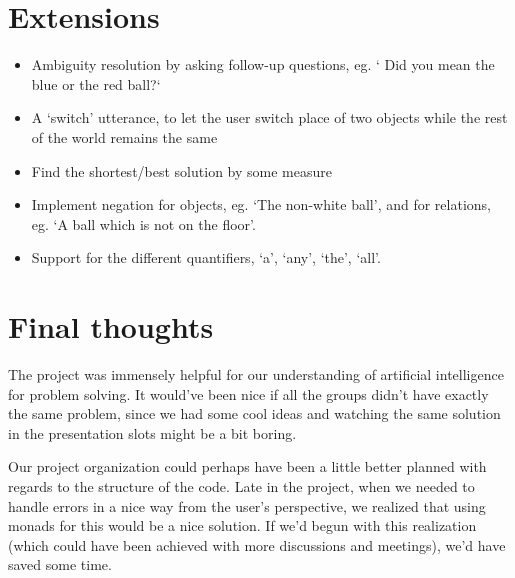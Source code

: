 \documentclass[11pt]{article}
\begin{document}








\section*{Extensions}
\begin{itemize}
\item Ambiguity resolution by asking follow-up questions, eg. ` Did you mean the blue or the red ball?`
\item A `switch' utterance, to let the user switch place of two objects while the rest of the world remains the same
\item Find the shortest/best solution by some measure
\item Implement negation for objects, eg. `The non-white ball', and for relations, eg. `A ball which is not on the floor'.
\item Support for the different quantifiers, `a', `any', `the', `all'.
\end{itemize}

\section*{Final thoughts}
The project was immensely helpful for our understanding of artificial intelligence for problem solving. It would've been nice if all the groups didn't have exactly the same problem, since we had some cool ideas and watching the same solution in the presentation slots might be a bit boring.

Our project organization could perhaps have been a little better planned with regards to the structure of the code.
Late in the project, when we needed to handle errors in a nice way from the user's perspective, we realized that using monads for this would be a nice solution.
If we'd begun with this realization (which could have been achieved with more discussions and meetings), we'd have saved some time.
\newpage


\newpage

\end{document}

